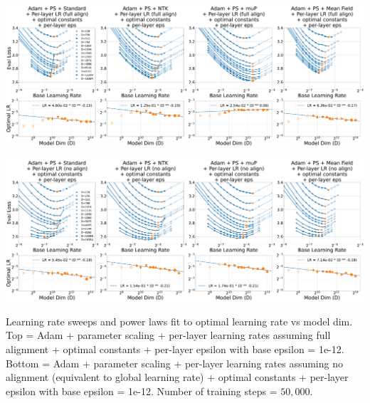 \thispagestyle{plain}
\begin{SidewaysFigure}
\includegraphics[width=0.98\linewidth]{icml2024/figures/lr_sweeps/appendix/adam_ps/adam_ps+50k_steps_per_module_lr_optimal_constants_per_module_eps_base_eps12.pdf}

\figvspace

\includegraphics[width=0.98\linewidth]{icml2024/figures/lr_sweeps/appendix/adam_ps/adam_ps+50k_steps_per_module_lr_no_align_optimal_constants_per_module_eps_base_eps12.pdf}
\caption{Learning rate sweeps and power laws fit to optimal learning rate vs model dim. Top = Adam + parameter scaling + per-layer learning rates assuming full alignment + optimal constants + per-layer epsilon with base epsilon = 1e-12. Bottom = Adam + parameter scaling + per-layer learning rates assuming no alignment (equivalent to global learning rate) + optimal constants + per-layer epsilon with base epsilon = 1e-12. Number of training steps = $50{,}000$.}
\end{SidewaysFigure}
\clearpage


